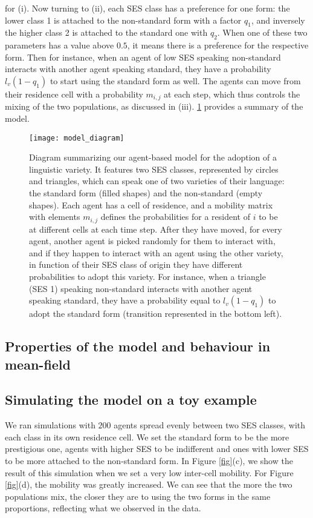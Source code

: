 \documentclass[../thesis.tex]{subfiles}
\begin{document}
for (i). Now turning to (ii), each \ac{SES} class has a preference for one form: the
lower class 1 is attached to the non-standard form with a factor $q_1$, and inversely
the higher class 2 is attached to the standard one with $q_2$. When one of these two
parameters has a value above $0.5$, it means there is a preference for the respective
form. Then for instance, when an agent of low \ac{SES} speaking non-standard interacts
with another agent speaking standard, they have a probability $l_v (1 - q_1)$ to start
using the standard form as well. The agents can move from their residence cell with a
probability $m_{i,j}$ at each step, which thus controls the mixing of the two
populations, as discussed in (iii). \cref{fig:model_diagram} provides a summary of the
model.
\begin{figure}
\centering
  \texttt{[image: model\_diagram]}
  \caption{Diagram summarizing our agent-based model for the adoption of a linguistic
  variety. It features two \ac{SES} classes, represented by circles and triangles, which
  can speak one of two varieties of their language: the standard form (filled shapes)
  and the non-standard (empty shapes). Each agent has a cell of residence, and a
  mobility matrix with elements $m_{i, j}$ defines the probabilities for a resident of
  $i$ to be at different cells at each time step. After they have moved, for every
  agent, another agent is picked randomly for them to interact with, and if they happen
  to interact with an agent using the other variety, in function of their \ac{SES} class
  of origin they have different probabilities to adopt this variety. For instance, when
  a triangle (\ac{SES} 1) speaking non-standard interacts with another agent speaking
  standard, they have a probability equal to $l_v (1 - q_1)$ to adopt the standard form
  (transition represented in the bottom left).}
  \label{fig:model_diagram}
\end{figure}




\subsection{Properties of the model and behaviour in mean-field}


\subsection{Simulating the model on a toy example}
We ran simulations with $200$ agents spread evenly between two \ac{SES} classes, with each
class in its own residence cell. We set the standard form to be the more prestigious
one, agents with higher \ac{SES} to be indifferent and ones with lower \ac{SES} to be more
attached to the non-standard form. In Figure \cref{fig}(c), we show the result of this
simulation when we set a very low inter-cell mobility. For Figure \cref{fig}(d), the
mobility was greatly increased. We can see that the more the two populations mix, the
closer they are to using the two forms in the same proportions, reflecting what we
observed in the data.
\end{document}
